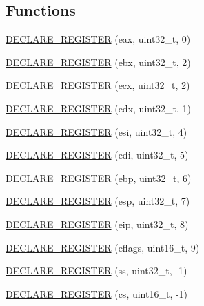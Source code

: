 \subsection*{Functions}
\begin{DoxyCompactItemize}
\item 
\mbox{\hyperlink{namespacexd_1_1reg_1_1x86__32_ac26a4d140e439b42678cd446fe173543}{D\+E\+C\+L\+A\+R\+E\+\_\+\+R\+E\+G\+I\+S\+T\+ER}} (eax, uint32\+\_\+t, 0)
\item 
\mbox{\hyperlink{namespacexd_1_1reg_1_1x86__32_a28f85968043878153ffeb7b5e6b30c2f}{D\+E\+C\+L\+A\+R\+E\+\_\+\+R\+E\+G\+I\+S\+T\+ER}} (ebx, uint32\+\_\+t, 2)
\item 
\mbox{\hyperlink{namespacexd_1_1reg_1_1x86__32_aa48194755223b65162ee51b5fe8814f6}{D\+E\+C\+L\+A\+R\+E\+\_\+\+R\+E\+G\+I\+S\+T\+ER}} (ecx, uint32\+\_\+t, 2)
\item 
\mbox{\hyperlink{namespacexd_1_1reg_1_1x86__32_a724664db05d688e40ddc5fa5be66b82a}{D\+E\+C\+L\+A\+R\+E\+\_\+\+R\+E\+G\+I\+S\+T\+ER}} (edx, uint32\+\_\+t, 1)
\item 
\mbox{\hyperlink{namespacexd_1_1reg_1_1x86__32_abc5532b25de68f8c358c26ebb1f3e31f}{D\+E\+C\+L\+A\+R\+E\+\_\+\+R\+E\+G\+I\+S\+T\+ER}} (esi, uint32\+\_\+t, 4)
\item 
\mbox{\hyperlink{namespacexd_1_1reg_1_1x86__32_a83ae7b4c9a121da1da590d58fdeac2c3}{D\+E\+C\+L\+A\+R\+E\+\_\+\+R\+E\+G\+I\+S\+T\+ER}} (edi, uint32\+\_\+t, 5)
\item 
\mbox{\hyperlink{namespacexd_1_1reg_1_1x86__32_a8ce6fc8b2da0de34e5ac966924b37379}{D\+E\+C\+L\+A\+R\+E\+\_\+\+R\+E\+G\+I\+S\+T\+ER}} (ebp, uint32\+\_\+t, 6)
\item 
\mbox{\hyperlink{namespacexd_1_1reg_1_1x86__32_a53790c6747a6afa25a8cbe449258dd7e}{D\+E\+C\+L\+A\+R\+E\+\_\+\+R\+E\+G\+I\+S\+T\+ER}} (esp, uint32\+\_\+t, 7)
\item 
\mbox{\hyperlink{namespacexd_1_1reg_1_1x86__32_a0af0fdd2d10d4d1cfc7aac0e5c4e759c}{D\+E\+C\+L\+A\+R\+E\+\_\+\+R\+E\+G\+I\+S\+T\+ER}} (eip, uint32\+\_\+t, 8)
\item 
\mbox{\hyperlink{namespacexd_1_1reg_1_1x86__32_ac628978da73d631b89355e76d2d73706}{D\+E\+C\+L\+A\+R\+E\+\_\+\+R\+E\+G\+I\+S\+T\+ER}} (eflags, uint16\+\_\+t, 9)
\item 
\mbox{\hyperlink{namespacexd_1_1reg_1_1x86__32_a77fdfe6574111c2ecf5f641d99c541ab}{D\+E\+C\+L\+A\+R\+E\+\_\+\+R\+E\+G\+I\+S\+T\+ER}} (ss, uint32\+\_\+t, -\/1)
\item 
\mbox{\hyperlink{namespacexd_1_1reg_1_1x86__32_ad468552d4bef54863be66521239a3b8a}{D\+E\+C\+L\+A\+R\+E\+\_\+\+R\+E\+G\+I\+S\+T\+ER}} (cs, uint16\+\_\+t, -\/1)

\end{DoxyCompactItemize}
